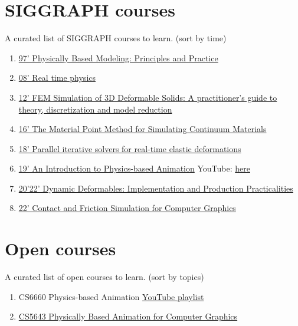 \documentclass{article}
\begin{document}
\section{SIGGRAPH courses}
\par A curated list of SIGGRAPH courses to learn. (sort by time)
\begin{enumerate}
    \item \href{https://www.cs.cmu.edu/~baraff/sigcourse/index.html}{97' Physically Based Modeling: Principles and Practice}
    \item \href{https://matthias-research.github.io/pages/publications/realtimeCoursenotes.pdf}{08' Real time physics}
    \item \href{https://viterbi-web.usc.edu/~jbarbic/femdefo/}{12' FEM Simulation of 3D Deformable Solids: A practitioner's guide to theory, discretization and model reduction}
    \item \href{https://www.math.ucla.edu/~cffjiang/research/mpmcourse/mpmcourse.pdf}{16' The Material Point Method for Simulating Continuum Materials}
    \item \href{https://mfratarcangeli.github.io/publication/sa2018course/}{18' Parallel iterative solvers for real-time elastic deformations}
    \item \href{https://www.cs.ucr.edu/~shinar/papers/2018_introduction_to_pba.pdf}{19' An Introduction to Physics-based Animation} \newline YouTube: \href{https://www.youtube.com/watch?v=b_WJ-HwalwU}{here}
    \item \href{https://www.tkim.graphics/DYNAMIC_DEFORMABLES/}{20'22' Dynamic Deformables: Implementation and Production Practicalities}
    \item \href{https://siggraphcontact.github.io/}{22' Contact and Friction Simulation for Computer Graphics}
\end{enumerate}

\section{Open courses}
\par A curated list of open courses to learn. (sort by topics)
\begin{enumerate}
    \item CS6660 Physics-based Animation \href{https://www.youtube.com/playlist?list=PL_a9tY9IhJuPc7e6r-3DMw_PbYbloKoWM}{YouTube playlist}
    \item \href{https://www.cs.cornell.edu/courses/cs5643/2023sp/}{CS5643 Physically Based Animation for Computer Graphics}
\end{enumerate}
\end{document}
